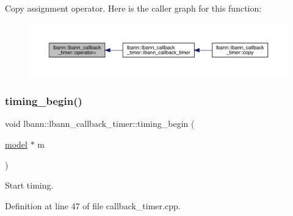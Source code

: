 Copy assignment operator. Here is the caller graph for this function\+:\nopagebreak
\begin{figure}[H]
\begin{center}
\leavevmode
\includegraphics[width=350pt]{classlbann_1_1lbann__callback__timer_ab7548a88159197f64dfc319f3e777c2a_icgraph}
\end{center}
\end{figure}
\mbox{\label{classlbann_1_1lbann__callback__timer_a5eb2a9d5c0c2fe4a7d7f45369928e2fd}} 
\subsubsection{\texorpdfstring{timing\+\_\+begin()}{timing\_begin()}}
{\footnotesize\ttfamily void lbann\+::lbann\+\_\+callback\+\_\+timer\+::timing\+\_\+begin (\begin{DoxyParamCaption}\item[{\hyperlink{classlbann_1_1model}{model} $\ast$}]{m }\end{DoxyParamCaption})\hspace{0.3cm}{\ttfamily [private]}}

Start timing. 

Definition at line 47 of file callback\+\_\+timer.\+cpp.


